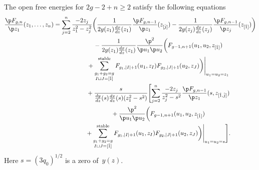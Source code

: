 \begin{thm} \label{thm:diff-rec}
The open free energies for $2g-2+n \ge 2$ satisfy
the following equations
\begin{gather}
\frac{\p F_{g,n}}{\p z_{1}}(z_{1},\dots,z_{n}) =
\sum_{j=2}^{n} \frac{-2z_{j}}{z_{1}^{2}-z_{j}^{2}}
\biggl( \frac{1}{2y(z_{1})\frac{dx}{dz}(z_{1})}
\frac{\p F_{g,n-1}}{\p z_{1}}(z_{[\hat{j}]})
 - \frac{1}{2y(z_{j})\frac{dx}{dz}(z_{j})}
\frac{\p F_{g,n-1}}{\p z_{j}}(z_{[\hat{1}]}) \biggr)
\nonumber\\
\hphantom{\frac{\p F_{g,n}}{\p z_{1}}(z_{1},\dots,z_{n}) =}{}
- \frac{1}{2y(z_{1})\frac{dx}{dz}(z_{1})} \frac{\p^{2}}{\p u_{1} \p u_{2}}
\biggl( F_{g-1,n+1}(u_{1},u_{2},z_{[\hat{1}]}) \nonumber\\
\hphantom{\frac{\p F_{g,n}}{\p z_{1}}(z_{1},\dots,z_{n}) =}{}
+
\sum_{\substack{g_{1}+g_{2}=g \\ I \sqcup J = [\hat{1}]}}^{\rm stable}
F_{g_{1}, |I|+1}(u_{1},z_{I}) F_{g_{2}, |J|+1}(u_{2}, z_{J})
\biggr)\Biggr|_{u_{1}=u_{2}=z_{1}}
\nonumber\\
\hphantom{\frac{\p F_{g,n}}{\p z_{1}}(z_{1},\dots,z_{n}) =}{}
+ \frac{s}{\frac{dy}{dz}(s) \frac{dx}{dz}(s)(z_{1}^{2}-s^{2})}
\Biggl[ \sum_{j=2}^{n} \frac{-2 z_{j}}{z_{j}^{2}-s^{2}}
\frac{\p F_{g,n-1}}{\p z_{1}}(s,z_{[\hat{1}, \hat{j}]})
\nonumber\\
\hphantom{\frac{\p F_{g,n}}{\p z_{1}}(z_{1},\dots,z_{n}) =}{}
+ \frac{\p^{2}}{\p u_{1} \p u_{2}}
\biggl( F_{g-1,n+1}(u_{1},u_{2},z_{[\hat{1}]})\nonumber\\
\hphantom{\frac{\p F_{g,n}}{\p z_{1}}(z_{1},\dots,z_{n}) =}{}
 +
\sum_{\substack{g_{1}+g_{2}=g \\
I \sqcup J = [\hat{1}]}}^{\rm stable}
F_{g_{1}, |I|+1}(u_{1},z_{I}) F_{g_{2}, |J|+1}(u_{2}, z_{J})
\biggr)\Biggr|_{u_{1}=u_{2}=s} \Biggr].\label{eq:diff-rec}
\end{gather}
Here
$s = (3q_{0})^{1/2}$
is a zero of~$y(z)$.
\end{thm}

